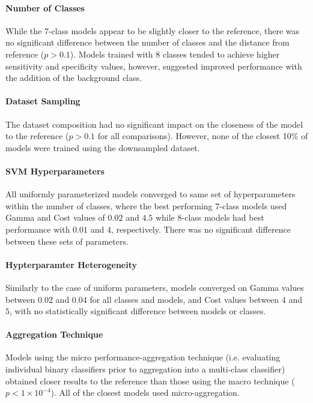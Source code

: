 \paragraph{Number of Classes}
While the 7-class models appear to be slightly closer to the reference, there was no significant difference between
the number of classes and the distance from reference ($p > 0.1$). Models trained with 8 classes tended to achieve
higher sensitivity and specificity values, however, suggested improved performance with the addition of the background
class. 

\paragraph{Dataset Sampling}
The dataset composition had no significant impact on the closeness of the model to the reference ($p > 0.1$ for all
comparisons). However, none of the closest 10\% of models were trained using the downsampled dataset.

\paragraph{SVM Hyperparameters}
All uniformly parameterized models converged to same set of hyperparameters within the number of classes, where the
best performing 7-class models used Gamma and Cost values of $0.02$ and $4.5$ while 8-class models had best performance
with $0.01$ and $4$, respectively. There was no significant difference between these sets of parameters.

\paragraph{Hypterparamter Heterogeneity}
Similarly to the case of uniform parameters, models converged on Gamma values between $0.02$ and $0.04$ for all classes
and models, and Cost values between $4$ and $5$, with no statistically significant difference between models or classes.

\paragraph{Aggregation Technique}
Models using the micro performance-aggregation technique (i.e. evaluating individual binary classifiers prior to
aggregation into a multi-class classifier) obtained closer results to the reference than those using the macro
technique ($p < 1\times 10^{-4}$). All of the closest models used micro-aggregation.

